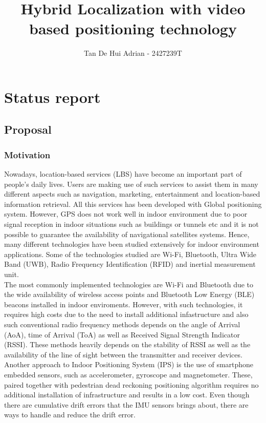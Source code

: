 \documentclass[11pt]{article}
\title{Hybrid Localization with video based positioning technology}
\author{Tan De Hui Adrian - 2427239T}
\begin{document}
    \maketitle
    
    
     

\section{Status report}

\subsection{Proposal}\label{proposal}

\subsubsection{Motivation}\label{motivation}

Nowadays, location-based services (LBS) have become an important part of people's daily lives. Users are making use of such services to assist them in many different aspects such as navigation, marketing, entertainment and location-based information retrieval. All this services has been developed with Global positioning system. However, GPS does not work well in indoor environment due to poor signal reception in indoor situations such as buildings or tunnels etc and it is not possible to guarantee the availability of navigational satellites systems. Hence, many different technologies have been studied extensively for indoor environment applications. Some of the technologies studied are Wi-Fi, Bluetooth, Ultra Wide Band (UWB), Radio Frequency Identification (RFID) and inertial measurement unit. \\

The most commonly implemented technologies are Wi-Fi and Bluetooth due to the wide availability of wireless access points and Bluetooth Low Energy (BLE) beacons installed in indoor enviroments. However, with such technologies, it requires high costs due to the need to install additional infastructure and also such conventional radio frequency methods depends on the angle of Arrival (AoA), time of Arrival (ToA) as well as Received Signal Strength Indicator (RSSI). These methods heavily depends on the stability of RSSI as well as the availability of the line of sight between the transmitter and receiver devices. \\

Another approach to Indoor Positioning System (IPS) is the use of smartphone embedded sensors, such as accelerometer, gyroscope and magnetometer. These, paired together with pedestrian dead reckoning positioning algorithm requires no additional installation of infrastructure and results in a low cost. Even though there are cumulative drift errors that the IMU sensors brings about, there are ways to handle and reduce the drift error.
\end{document}
